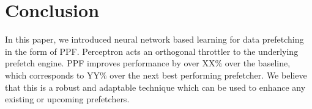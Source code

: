 \section{Conclusion}
\label{Conclusion}
In this paper, we introduced neural network based learning for data
prefetching in the form of PPF.  Perceptron acts an orthogonal
throttler to the underlying prefetch engine.  PPF improves
performance by over XX\% over the baseline, which corresponds to YY\%
over the next best performing prefetcher.  
We believe that this is a robust and adaptable technique which can
be used to enhance any existing or upcoming prefetchers.
